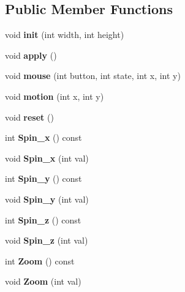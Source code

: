 \subsection*{Public Member Functions}
\begin{DoxyCompactItemize}
\item 
void {\bfseries init} (int width, int height)\label{classSoundfieldViewer_1_1CameraControl_a54dc7f7e9e098e5c56cd7ddf61324d21}

\item 
void {\bfseries apply} ()\label{classSoundfieldViewer_1_1CameraControl_a3f64f5225dc90629b7b4cea15731a1de}

\item 
void {\bfseries mouse} (int button, int state, int x, int y)\label{classSoundfieldViewer_1_1CameraControl_a0c55dd081f9b030a2dfc275c084384fe}

\item 
void {\bfseries motion} (int x, int y)\label{classSoundfieldViewer_1_1CameraControl_ae163063dfe9d95126376d9a3d5ad485c}

\item 
void {\bfseries reset} ()\label{classSoundfieldViewer_1_1CameraControl_a99de5d322653029eef5917df212317a1}

\item 
int {\bfseries Spin\-\_\-x} () const \label{classSoundfieldViewer_1_1CameraControl_a7b73a56254da29749c1195cac961e332}

\item 
void {\bfseries Spin\-\_\-x} (int val)\label{classSoundfieldViewer_1_1CameraControl_acf012d8583c4dfa3c8a866372a48a07d}

\item 
int {\bfseries Spin\-\_\-y} () const \label{classSoundfieldViewer_1_1CameraControl_a5fec5a0891555f2038623b009acb0fc9}

\item 
void {\bfseries Spin\-\_\-y} (int val)\label{classSoundfieldViewer_1_1CameraControl_a8a2c34b8ef414ac63a079dc5b31e36c5}

\item 
int {\bfseries Spin\-\_\-z} () const \label{classSoundfieldViewer_1_1CameraControl_a11d772df8a501084f1652d72460451c4}

\item 
void {\bfseries Spin\-\_\-z} (int val)\label{classSoundfieldViewer_1_1CameraControl_ac04d463c3f7945f1fc74f1cfc246ba00}

\item 
int {\bfseries Zoom} () const \label{classSoundfieldViewer_1_1CameraControl_abb340588df42405b4e0fc78e89bd63fb}

\item 
void {\bfseries Zoom} (int val)\label{classSoundfieldViewer_1_1CameraControl_a99fb592ac26ba402cf1c38d6bee3d6ca}

\end{DoxyCompactItemize}
